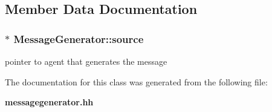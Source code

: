 \subsection{Member Data Documentation}
\subsubsection[source]{$\ast$ {\bf MessageGenerator::source}\hspace{0.3cm}{\tt  [protected]}}\label{classMessageGenerator_12b7c0be392b69580cd68779f8f972e0}


pointer to agent that generates the message 



The documentation for this class was generated from the following file:\begin{CompactItemize}
\item 
{\bf messagegenerator.hh}\end{CompactItemize}
